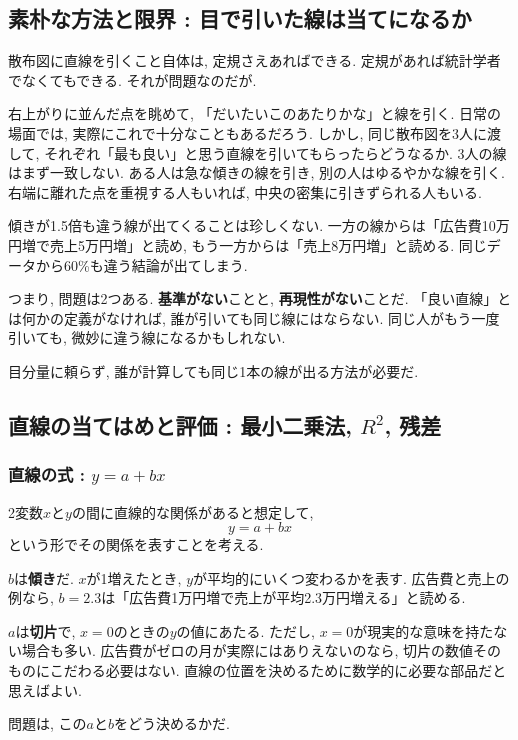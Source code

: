\subsection{素朴な方法と限界 : 目で引いた線は当てになるか}

散布図に直線を引くこと自体は, 定規さえあればできる.
定規があれば統計学者でなくてもできる. それが問題なのだが.

右上がりに並んだ点を眺めて, 「だいたいこのあたりかな」と線を引く.
日常の場面では, 実際にこれで十分なこともあるだろう.
しかし, 同じ散布図を3人に渡して, それぞれ「最も良い」と思う直線を引いてもらったらどうなるか.
3人の線はまず一致しない.
ある人は急な傾きの線を引き, 別の人はゆるやかな線を引く.
右端に離れた点を重視する人もいれば, 中央の密集に引きずられる人もいる.

傾きが1.5倍も違う線が出てくることは珍しくない.
一方の線からは「広告費10万円増で売上5万円増」と読め, もう一方からは「売上8万円増」と読める.
同じデータから60\%も違う結論が出てしまう.

つまり, 問題は2つある.
\textbf{基準がない}ことと, \textbf{再現性がない}ことだ.
「良い直線」とは何かの定義がなければ, 誰が引いても同じ線にはならない.
同じ人がもう一度引いても, 微妙に違う線になるかもしれない.

目分量に頼らず, 誰が計算しても同じ1本の線が出る方法が必要だ.


\subsection{直線の当てはめと評価 : 最小二乗法, $R^2$, 残差}

\subsubsection*{直線の式 : $y = a + bx$}

2変数$x$と$y$の間に直線的な関係があると想定して,
\[
  y = a + bx
\]
という形でその関係を表すことを考える.

$b$は\textbf{傾き}だ.
$x$が1増えたとき, $y$が平均的にいくつ変わるかを表す.
広告費と売上の例なら, $b = 2.3$は「広告費1万円増で売上が平均2.3万円増える」と読める.

$a$は\textbf{切片}で, $x = 0$のときの$y$の値にあたる.
ただし, $x = 0$が現実的な意味を持たない場合も多い.
広告費がゼロの月が実際にはありえないのなら, 切片の数値そのものにこだわる必要はない.
直線の位置を決めるために数学的に必要な部品だと思えばよい.

問題は, この$a$と$b$をどう決めるかだ.

